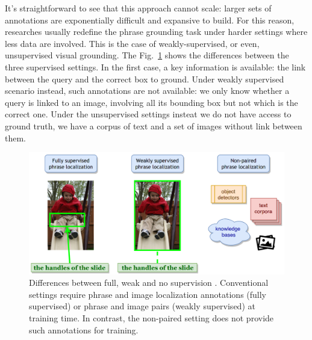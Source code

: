It's straightforward to see that this approach cannot scale: larger
sets of annotations are exponentially difficult and expansive to
build. For this reason, researches usually redefine the phrase
grounding task under harder settings where less data are involved.
This is the case of weakly-supervised, or even, unsupervised visual
grounding. The Fig.~\ref{fig:full-weak-no-supervision} shows the
differences between the three supervised settings. In the first case,
a key information is available: the link between the query and the
correct box to ground. Under weakly supervised scenario instead, such
annotations are not available: we only know whether a query is linked
to an image, involving all its bounding box but not which is the
correct one. Under the unsupervised settings insteat we do not have
access to ground truth, we have a corpus of text and a set of images
without link between them.

\begin{figure}[H]
  \centering
  \includegraphics[width=.8\textwidth]{figures/full-weak-no-supervision.png}
  \caption[Differences between full, weak and no supervision]{
    Differences between full, weak and no supervision
    \cite{wang2019phrase}. Conventional settings require phrase and
    image localization annotations (fully supervised) or phrase and
    image pairs (weakly supervised) at training time. In contrast, the
    non-paired setting does not provide such annotations for training.
  }
  \label{fig:full-weak-no-supervision}
\end{figure}

